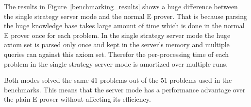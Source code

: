 The results in Figure~\ref{benchmarking_results} shows a huge difference between the single strategy server mode and the normal E prover. That is because parsing the huge knowledge base takes large amount of time which is done in the normal E prover once for each problem. In the single strategy server mode the huge axiom set is parsed only once and kept in the server's memory and multiple queries ran against this axiom set. Therefor the per-processing time of each problem in the single strategy server mode is amortized over multiple runs.

Both modes solved the same 41 problems out of the 51 problems used in the benchmarks. This means that the server mode has a performance advantage over the plain E prover without affecting its efficiency.
